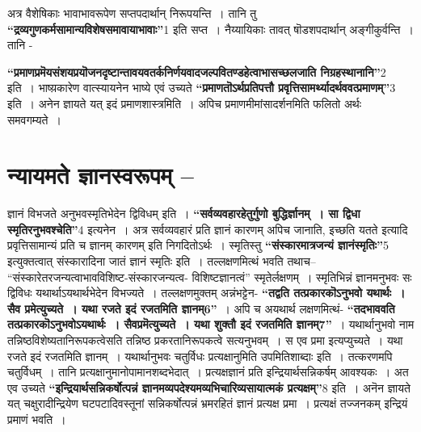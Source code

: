 {अत्र वैशेषिकाः भावाभावरूपेण सप्तपदार्थान् निरूपयन्ति~। तानि तु \textbf{“द्रव्यगुणकर्मसामान्यविशेषसमावायाभावाः”}1 इति सप्त~। नैय्यायिकाः तावत् षॊडशपदार्थान् अङ्गीकुर्वन्ति~। तानि -

\textbf{“प्रमाणप्रमॆयसंशयप्रयॊजनदृष्टान्तावयवतर्कनिर्णयवादजल्पवितण्डहेत्वाभासच्छलजाति निग्रहस्थानानि”}2 इति~। भाष्य़कारेण वात्स्यायनेन भाष्ये एवं उच्यते \textbf{“प्रमाणतॊऽर्थप्रतिपत्तौ प्रवृत्तिसामर्थ्यादर्थववत्प्रमाणम्”}3 इति~। अनेन ज्ञायते यत् इदं प्रमाणशास्त्रमिति~। अपिच प्रमाणमीमांसादर्शनमिति फलितो अर्थः समवगम्यते~। 

\section*{न्यायमते ज्ञानस्वरूपम् –}

ज्ञानं विभजते अनुभवस्मृतिभेदेन द्विविधम् इति~। \textbf{“सर्वव्यवहारहेतुर्गुणो बुद्धिर्ज्ञानम्~। सा द्विधा स्मृतिरनुभवश्चेति”}4 इत्यनेन~। अत्र सर्वव्यवहारं प्रति ज्ञानं कारणम् अपिच जानाति, इच्छति यतते इत्यादि प्रवृत्तिसामान्यं प्रति च ज्ञानम् कारणम् इति निगदितोऽर्थः~। स्मृतिस्तु \textbf{“संस्कारमात्रजन्यं ज्ञानंस्मृतिः”}5 इत्युक्तत्वात् संस्कारादिना जातं ज्ञानं स्मृतिः इति~। तल्लक्षणमित्थं भवति तथाच– “संस्कारेतरजन्यत्वाभावविशिष्ट-संस्कारजन्यत्व- विशिष्टज्ञानत्वं” स्मृतेर्लक्षणम्~। स्मृतिभिन्नं ज्ञानमनुभवः सः द्विविधः यथार्थाऽयथार्थभेदेन विभज्यते~। तल्लक्षणमुक्तम् अन्नंभट्टेन- \textbf{“तद्वति तत्प्रकारकॊऽनुभवो यथार्थः~। सैव प्रमेत्युच्यते~। यथा रजते इदं रजतमिति ज्ञानम्6”}~। अपि च अयथार्थ लक्षणमित्थं- \textbf{“तदभाववति तत्प्रकारकॊऽनुभवोऽयथार्थः~। सैवप्रमॆत्युच्यते~। यथा शुक्तौ इदं रजतमिति ज्ञानम्7”}~। यथार्थानुभवो नाम तन्निष्ठविशेष्यतानिरूपकत्वेसति तन्निष्ठ प्रकरतानिरूपकत्वे सत्यनुभवम्~। स एव प्रमा इत्यप्युच्यते~। यथा रजते इदं रजतमिति ज्ञानम्~। यथार्थानुभवः चतुर्विधः प्रत्यक्षानुमिति उपमितिशाब्दाः इति~। तत्करणमपि चतुर्विधम्~। तानि प्रत्यक्षानुमानोपामानशब्दभेदात्~। प्रत्यक्षज्ञानं प्रति इन्द्रियार्थसन्निकर्षम् आवश्यकः~। अत एव उच्यते \textbf{“इन्द्रियार्थसन्निकर्षोत्पन्नं ज्ञानमव्यपदेश्यमव्यभिचारिव्यसायात्मकं प्रत्यक्षम्”}8 इति~। अनॆन ज्ञायते यत् चक्षुरादीन्द्रियेण घटपटादिवस्तूनां सन्निकर्षोत्पन्नं भ्रमरहितं ज्ञानं प्रत्यक्ष प्रमा~। प्रत्यक्षं तज्जनकम् इन्द्रियं प्रमाणं भवति~। 

}
